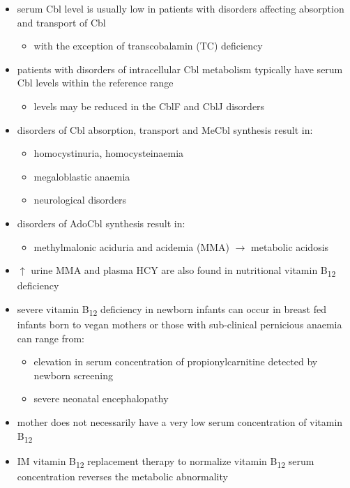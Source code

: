\documentclass[12pt]{scrartcl}
\begin{document}
\begin{itemize}
\item serum Cbl level is usually low in patients with disorders affecting
absorption and transport of Cbl
\begin{itemize}
\item with the exception of transcobalamin (TC) deficiency
\end{itemize}
\item patients with disorders of intracellular Cbl metabolism typically
have serum Cbl levels within the reference range
\begin{itemize}
\item levels may be reduced in the CblF and CblJ disorders
\end{itemize}
\item disorders of Cbl absorption, transport and MeCbl synthesis result in:
\begin{itemize}
\item homocystinuria, homocysteinaemia
\item megaloblastic anaemia
\item neurological disorders
\end{itemize}
\item disorders of AdoCbl synthesis result in:
\begin{itemize}
\item methylmalonic aciduria and acidemia (MMA) \(\to\) metabolic
acidosis
\end{itemize}
\item \(\uparrow\) urine MMA and plasma HCY are also found in nutritional
vitamin B\textsubscript{12} deficiency
\item severe vitamin B\textsubscript{12} deficiency in newborn infants can occur in
breast fed infants born to vegan mothers or those with sub-clinical
pernicious anaemia can range from:
\begin{itemize}
\item elevation in serum concentration of propionylcarnitine detected by
newborn screening
\item severe neonatal encephalopathy
\end{itemize}
\item mother does not necessarily have a very low serum concentration of
vitamin B\textsubscript{12}
\item IM vitamin B\textsubscript{12} replacement therapy to normalize vitamin B\textsubscript{12} serum
concentration reverses the metabolic abnormality
\end{itemize}
\end{document}

